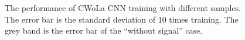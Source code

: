 \documentclass[12pt]{article}
\begin{document}
        \begin{figure}[htpb]
            \centering
            \caption{The performance of CWoLa CNN training with different samples. The error bar is the standard deviation of 10 times training. The grey band is the error bar of the ``without signal'' case.}
            \label{fig:acc_curve_origin_aug_1_res_75_25_new_workflow}
        \end{figure}
\end{document}
